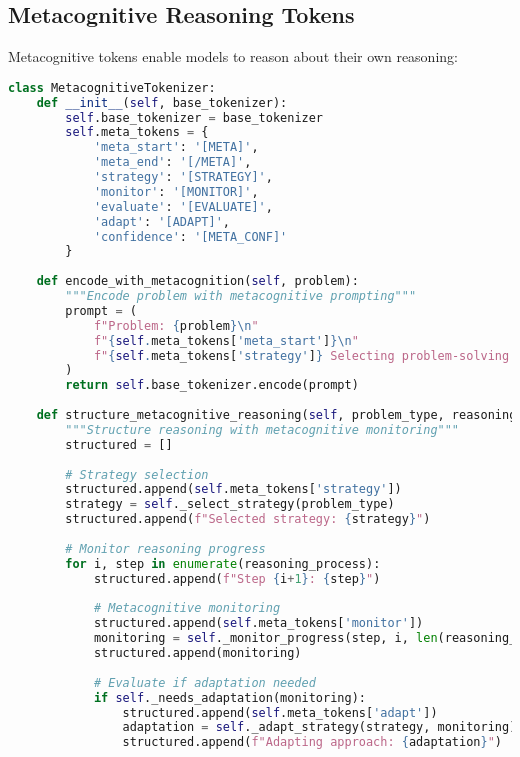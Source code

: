 \subsection{Metacognitive Reasoning Tokens}

Metacognitive tokens enable models to reason about their own reasoning:

\begin{lstlisting}[language=Python, caption=Metacognitive reasoning tokens]
class MetacognitiveTokenizer:
    def __init__(self, base_tokenizer):
        self.base_tokenizer = base_tokenizer
        self.meta_tokens = {
            'meta_start': '[META]',
            'meta_end': '[/META]',
            'strategy': '[STRATEGY]',
            'monitor': '[MONITOR]',
            'evaluate': '[EVALUATE]',
            'adapt': '[ADAPT]',
            'confidence': '[META_CONF]'
        }
        
    def encode_with_metacognition(self, problem):
        """Encode problem with metacognitive prompting"""
        prompt = (
            f"Problem: {problem}\n"
            f"{self.meta_tokens['meta_start']}\n"
            f"{self.meta_tokens['strategy']} Selecting problem-solving approach...\n"
        )
        return self.base_tokenizer.encode(prompt)
    
    def structure_metacognitive_reasoning(self, problem_type, reasoning_process):
        """Structure reasoning with metacognitive monitoring"""
        structured = []
        
        # Strategy selection
        structured.append(self.meta_tokens['strategy'])
        strategy = self._select_strategy(problem_type)
        structured.append(f"Selected strategy: {strategy}")
        
        # Monitor reasoning progress
        for i, step in enumerate(reasoning_process):
            structured.append(f"Step {i+1}: {step}")
            
            # Metacognitive monitoring
            structured.append(self.meta_tokens['monitor'])
            monitoring = self._monitor_progress(step, i, len(reasoning_process))
            structured.append(monitoring)
            
            # Evaluate if adaptation needed
            if self._needs_adaptation(monitoring):
                structured.append(self.meta_tokens['adapt'])
                adaptation = self._adapt_strategy(strategy, monitoring)
                structured.append(f"Adapting approach: {adaptation}")
        

\end{lstlisting}
